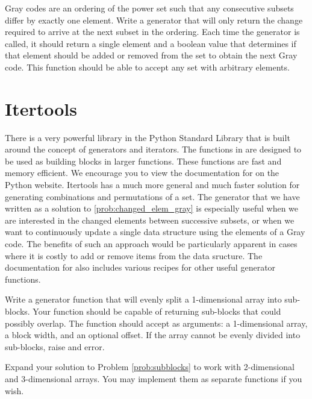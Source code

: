 \begin{problem}
\label{prob:changed_elem_gray}
Gray codes are an ordering of the power set such that any consecutive subsets differ by exactly one element.  Write a generator that will only return the change required to arrive at the next subset in the ordering.  Each time the generator is called, 
it should return a single element and a boolean value that determines if that element should be
added or removed from the set to obtain the next Gray code.  This function should be able to accept any set with arbitrary elements.
\end{problem}

\section*{Itertools}
There is a very powerful library in the Python Standard Library that is built around the concept
of generators and iterators.  The functions in  are designed to be used as
building blocks in larger functions.  These functions are fast and memory efficient.
We encourage you to view the documentation for  on the Python website.  Itertools has a much more general and much faster solution for generating combinations and permutations of a set.
The generator that we have written as a solution to \ref{prob:changed_elem_gray} is especially useful when we are interested in the changed elements between successive subsets, or when we want to continuously update a single data structure using the elements of a Gray code.
The benefits of such an approach would be particularly apparent in cases where it is costly to add or remove items from the data sructure.
The documentation for  also includes various recipes for other useful generator functions.

\begin{problem}
\label{prob:subblocks}
Write a generator function that will evenly split a 1-dimensional array into sub-blocks.
Your function should be capable of returning sub-blocks that could possibly overlap.
The function should accept as arguments: a 1-dimensional array,
a block width, and an optional offset.  If the array cannot be evenly divided into
sub-blocks, raise and error.
\end{problem}

\begin{problem}
Expand your solution to Problem \ref{prob:subblocks} to work with 2-dimensional and 3-dimensional
arrays.  You may implement them as separate functions if you wish.
\end{problem}

\printbibliography

% 
